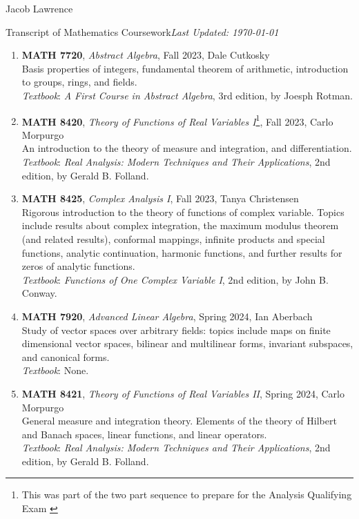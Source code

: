 \documentclass{article}
\begin{document}
\huge Jacob Lawrence

\large Transcript of Mathematics Coursework\hfill \normalsize \textit{Last Updated: \today}

\begin{enumerate}[leftmargin=*]
    \item[] \textbf{MATH 7720}, \textit{Abstract Algebra}, Fall 2023, Dale Cutkosky \\ 
    Basis properties of integers, fundamental theorem of arithmetic, introduction to groups, rings, and fields.\\
    \textit{Textbook}: \textit{A First Course in Abstract Algebra}, 3rd edition, by Joesph Rotman.  

    \item[] \textbf{MATH 8420}, \textit{Theory of Functions of Real Variables I}\footnote{This was part of the two part sequence to prepare for the Analysis Qualifying Exam \label{Analysis Qual}}, Fall 2023, Carlo Morpurgo\\
    An introduction to the theory of measure and integration, and differentiation.  \\
    \textit{Textbook}: \textit{Real Analysis: Modern Techniques and Their Applications}, 2nd edition, by Gerald B. Folland. 

    \item[] \textbf{MATH 8425}, \textit{Complex Analysis I}, Fall 2023, Tanya Christensen\\
    Rigorous introduction to the theory of functions of complex variable. Topics include results about complex integration, the maximum modulus theorem (and related results), conformal mappings, infinite products and special functions, analytic continuation, harmonic functions, and further results for zeros of analytic functions. \\
    \textit{Textbook}: \textit{Functions of One Complex Variable I}, 2nd edition, by John B. Conway. 
    
    \item[] \textbf{MATH 7920}, \textit{Advanced Linear Algebra}, Spring 2024, Ian Aberbach\\
    Study of vector spaces over arbitrary fields: topics include maps on finite dimensional vector spaces, bilinear and multilinear forms, invariant subspaces, and canonical forms. \\
    \textit{Textbook}: None.  

    \item[] \textbf{MATH 8421}, \textit{Theory of Functions of Real Variables II}, Spring 2024, Carlo Morpurgo \\
    General measure and integration theory. Elements of the theory of Hilbert and Banach spaces, linear functions, and linear operators. \\
    \textit{Textbook}: \textit{Real Analysis: Modern Techniques and Their Applications}, 2nd edition, by Gerald B. Folland. 


\end{enumerate}
\end{document}

